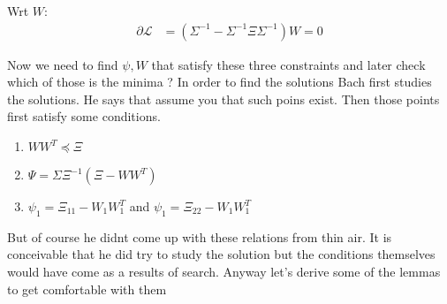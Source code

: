 \documentclass[11pt]{article}
\begin{document}
Wrt $W$:
\begin{align}
 \partial \mathcal{L} &= (\Sigma^{-1}  - \Sigma^{-1}\Xi\Sigma^{-1})W = 0
\end{align}

Now we need to find $\psi, W$ that satisfy these three constraints and
later check which of those is the minima ? 
In order to find the solutions Bach first studies the solutions. He
says that assume you that such poins exist. Then those points 
first satisfy some conditions. 
\begin{enumerate}
\item $WW^T \preccurlyeq \Xi$
\item $\Psi = \Sigma\Xi^{-1}(\Xi - WW^T)$
\item $\psi_1 = \Xi_{11} - W_1 W_1^T$ and $\psi_1 = \Xi_{22} - W_1 W_1^T$
\end{enumerate}

But of course he didnt come up with these relations from thin air. It
is conceivable that he did try to study the solution but the
conditions themselves would have come as a results of search. Anyway
let's derive some of the lemmas to get comfortable with them
\end{document}
